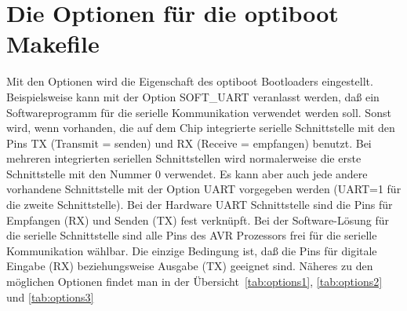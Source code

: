 \section{Die Optionen für die optiboot Makefile}

Mit den Optionen wird die Eigenschaft des optiboot Bootloaders eingestellt.
Beispielsweise kann mit der Option SOFT\_UART veranlasst werden, daß ein
Softwareprogramm für die serielle Kommunikation verwendet werden soll.
Sonst wird, wenn vorhanden, die auf dem Chip integrierte  serielle Schnittstelle
mit den Pins TX (Transmit = senden) und RX (Receive = empfangen) benutzt.
Bei mehreren integrierten seriellen Schnittstellen wird normalerweise die erste
Schnittstelle mit den Nummer 0 verwendet. Es kann aber auch jede andere vorhandene
Schnittstelle mit der Option UART vorgegeben werden (UART=1 für die zweite Schnittstelle).
Bei der Hardware UART Schnittstelle sind die Pins für Empfangen (RX) und Senden (TX)
fest verknüpft. Bei der Software-Lösung für die serielle Schnittstelle sind alle Pins
des AVR Prozessors frei für die serielle Kommunikation wählbar. Die einzige Bedingung
ist, daß die Pins für digitale Eingabe (RX) beziehungsweise Ausgabe (TX) geeignet sind.
Näheres zu den möglichen Optionen findet man in der Übersicht~\ref{tab:options1}, \ref{tab:options2}
und \ref{tab:options3}

